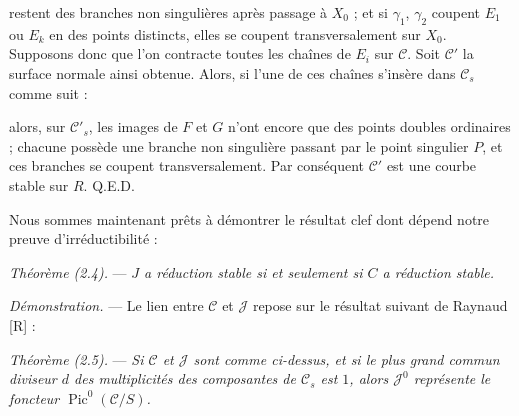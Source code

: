 \documentclass[10pt]{article}
\newcommand{\Pic}{\operatorname{Pic}}
\newcommand{\QED}{\hfill Q.E.D.}
\begin{document}
restent des branches non singulières après passage à $X_0$ ; et si $\gamma_1$, $\gamma_2$ coupent $E_1$ ou $E_k$ en des points distincts, elles se coupent transversalement sur $X_0$. Supposons donc que l'on contracte toutes les chaînes de $E_i$ sur $\mathscr C$. Soit $\mathscr C'$ la surface normale ainsi obtenue. Alors, si l'une de ces chaînes s'insère dans $\mathscr C_s$ comme suit :

\begin{center}
\end{center}

alors, sur $\mathscr C'_s$, les images de $F$ et $G$ n'ont encore que des points doubles ordinaires ; chacune possède une branche non singulière passant par le point singulier $P$, et ces branches se coupent transversalement. Par conséquent $\mathscr C'$ est une courbe stable sur $R$. \QED


Nous sommes maintenant prêts à démontrer le résultat clef dont dépend notre preuve d'irréductibilité :

\medskip
\noindent\emph{Théorème (2.4).} --- \emph{$J$ a réduction stable si et seulement si $C$ a réduction stable.}

\noindent\emph{Démonstration.} --- Le lien entre $\mathscr C$ et $\mathscr J$ repose sur le résultat suivant de Raynaud [R] :

\medskip
\noindent\emph{Théorème (2.5).} --- \emph{Si $\mathscr C$ et $\mathscr J$ sont comme ci-dessus, et si le plus grand commun diviseur $d$ des multiplicités des composantes de $\mathscr C_s$ est $1$, alors $\mathscr J^0$ représente le foncteur $\Pic^0(\mathscr C/S)$.}
\end{document}
